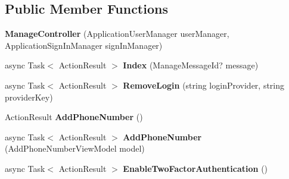 \subsection*{Public Member Functions}
\begin{DoxyCompactItemize}
\item 
\mbox{\label{class_alfa_accounting_1_1_controllers_1_1_manage_controller_aa0f0be2f4c8106c78660faa2dd379beb}} 
{\bfseries Manage\+Controller} (Application\+User\+Manager user\+Manager, Application\+Sign\+In\+Manager sign\+In\+Manager)
\item 
\mbox{\label{class_alfa_accounting_1_1_controllers_1_1_manage_controller_ae0d6ce621b8e19785c12e4bfd7d36883}} 
async Task$<$ Action\+Result $>$ {\bfseries Index} (Manage\+Message\+Id? message)
\item 
\mbox{\label{class_alfa_accounting_1_1_controllers_1_1_manage_controller_a53cde16ca3522116b6aa1f0c801ebe1d}} 
async Task$<$ Action\+Result $>$ {\bfseries Remove\+Login} (string login\+Provider, string provider\+Key)
\item 
\mbox{\label{class_alfa_accounting_1_1_controllers_1_1_manage_controller_ac9b0d0054c6c951870ef2b318ee7386f}} 
Action\+Result {\bfseries Add\+Phone\+Number} ()
\item 
\mbox{\label{class_alfa_accounting_1_1_controllers_1_1_manage_controller_a268f8e825aad6a1af2273c5279884927}} 
async Task$<$ Action\+Result $>$ {\bfseries Add\+Phone\+Number} (Add\+Phone\+Number\+View\+Model model)
\item 
\mbox{\label{class_alfa_accounting_1_1_controllers_1_1_manage_controller_affffaf9860bc5217375fad84d2cb728b}} 
async Task$<$ Action\+Result $>$ {\bfseries Enable\+Two\+Factor\+Authentication} ()
\item 
\mbox{\label{class_alfa_accounting_1_1_controllers_1_1_manage_controller_a45fb91e0bbc95445a29854b3952eeaf9}} 

\end{DoxyCompactItemize}
